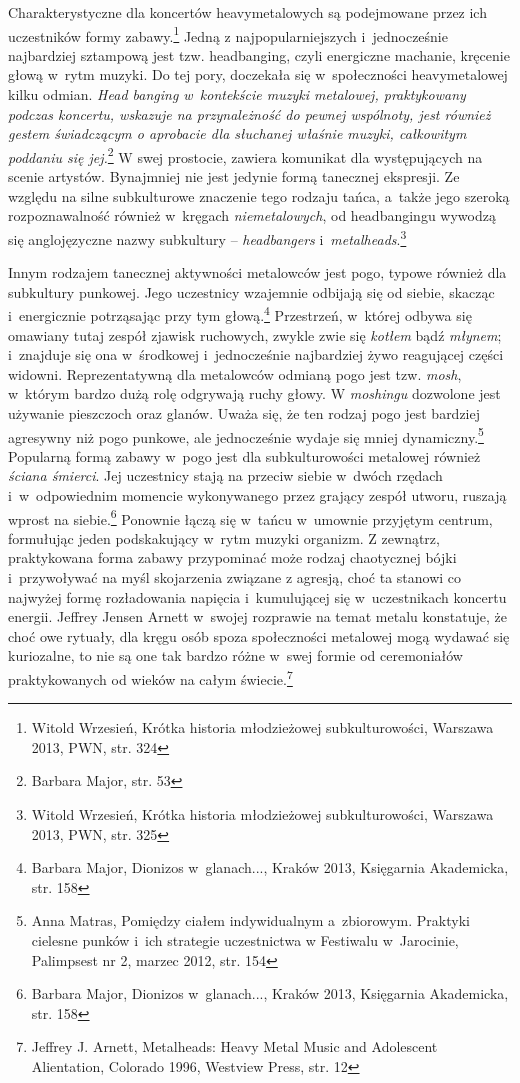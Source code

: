 \documentclass[12pt, a4paper, titlepage]{report}
\begin{document}
Charakterystyczne dla koncertów heavymetalowych są podejmowane przez ich uczestników formy zabawy.\footnote{Witold Wrzesień, Krótka historia młodzieżowej subkulturowości, Warszawa 2013, PWN, \break str. 324} Jedną z najpopularniejszych i~jednocześnie najbardziej sztampową jest tzw. headbanging, czyli energiczne machanie, kręcenie głową w~rytm muzyki. Do tej pory, doczekała się w~społeczności heavymetalowej kilku odmian. \textit{Head banging w~kontekście muzyki metalowej, praktykowany podczas koncertu, wskazuje na przynależność do pewnej wspólnoty, jest również gestem świadczącym o aprobacie dla słuchanej właśnie muzyki, całkowitym poddaniu się jej.}\footnote{Barbara Major, str. 53} W swej prostocie, zawiera komunikat dla występujących na scenie artystów. Bynajmniej nie jest jedynie formą tanecznej ekspresji. Ze względu na silne subkulturowe znaczenie tego rodzaju tańca, a~także jego szeroką rozpoznawalność również w~kręgach \textit{niemetalowych}, od headbangingu wywodzą się anglojęzyczne nazwy subkultury -- \textit{headbangers} i~\textit{metalheads}.\footnote{Witold Wrzesień, Krótka historia młodzieżowej subkulturowości, Warszawa 2013, PWN, \break str. 325} 

Innym rodzajem tanecznej aktywności metalowców jest pogo, typowe również dla subkultury punkowej. Jego uczestnicy wzajemnie odbijają się od siebie, skacząc i~energicznie potrząsając przy tym głową.\footnote{Barbara Major, Dionizos w~glanach..., Kraków 2013, Księgarnia Akademicka, str. 158} Przestrzeń, w~której odbywa się omawiany tutaj zespół zjawisk ruchowych, zwykle zwie się \textit{kotłem} bądź \textit{młynem}; i~znajduje się ona w~środkowej i~jednocześnie najbardziej żywo reagującej części widowni. Reprezentatywną dla metalowców odmianą pogo jest tzw. \textit{mosh}, w~którym bardzo dużą rolę odgrywają ruchy głowy. W \textit{moshingu} dozwolone jest używanie pieszczoch oraz glanów. Uważa się, że ten rodzaj pogo jest bardziej agresywny niż pogo punkowe, ale jednocześnie wydaje się mniej dynamiczny.\footnote{Anna Matras, Pomiędzy ciałem indywidualnym a~zbiorowym. Praktyki cielesne punków i~ich strategie uczestnictwa w Festiwalu w~Jarocinie, Palimpsest nr 2, marzec 2012, str. 154} Popularną formą zabawy w~pogo jest dla subkulturowości metalowej również \textit{ściana śmierci}. Jej uczestnicy stają na przeciw siebie w~dwóch rzędach i~w~odpowiednim momencie wykonywanego przez grający zespół utworu, ruszają wprost na siebie.\footnote{Barbara Major, Dionizos w~glanach..., Kraków 2013, Księgarnia Akademicka, str. 158} Ponownie łączą się w~tańcu w~umownie przyjętym centrum, formułując jeden podskakujący w~rytm muzyki organizm. Z zewnątrz, praktykowana forma zabawy przypominać może rodzaj chaotycznej bójki i~przywoływać na myśl skojarzenia związane z agresją, choć ta stanowi co najwyżej formę rozładowania napięcia i~kumulującej się w~uczestnikach koncertu energii. Jeffrey Jensen Arnett w~swojej rozprawie na temat metalu konstatuje, że choć owe rytuały, dla kręgu osób spoza społeczności metalowej mogą wydawać się kuriozalne, to nie są one tak bardzo różne w~swej formie od ceremoniałów praktykowanych od wieków na całym świecie.\footnote{Jeffrey J. Arnett, Metalheads: Heavy Metal Music and Adolescent Alientation, Colorado 1996, Westview Press, str. 12} 
\end{document}
